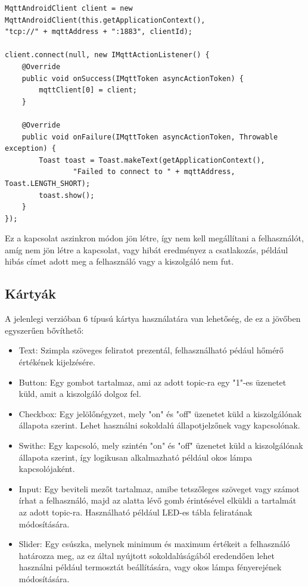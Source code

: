 \documentclass[
]{thesis-ekf}
\theoremstyle{definition}
\theoremstyle{remark}
\begin{document}
\lstset{language=Java}  
\begin{lstlisting}[frame=single]
MqttAndroidClient client = new MqttAndroidClient(this.getApplicationContext(),
"tcp://" + mqttAddress + ":1883", clientId);

client.connect(null, new IMqttActionListener() {
	@Override
	public void onSuccess(IMqttToken asyncActionToken) {
		mqttClient[0] = client;
	}

	@Override
	public void onFailure(IMqttToken asyncActionToken, Throwable exception) {
		Toast toast = Toast.makeText(getApplicationContext(),
				"Failed to connect to " + mqttAddress, Toast.LENGTH_SHORT);
		toast.show();
	}
});
\end{lstlisting}

Ez a kapcsolat aszinkron módon jön létre, így nem kell megállítani a felhasználót, amíg nem jön létre a
kapcsolat, vagy hibát eredményez a csatlakozás, például hibás címet adott meg a felhasználó vagy
a kiszolgáló nem fut.

\subsection{Kártyák}
A jelenlegi verzióban 6 típusú kártya használatára van lehetőség, de ez a jövőben egyszerűen bővíthető:
\begin{itemize}
	\item Text: Szimpla szöveges feliratot prezentál, felhasználható pédául hőmérő értékének kijelzésére.
	\item Button: Egy gombot tartalmaz, ami az adott topic-ra egy "1"-es üzenetet küld, amit a kiszolgáló
	dolgoz fel.
	\item Checkbox: Egy jelölőnégyzet, mely "on" és "off" üzenetet küld a kiszolgálónak állapota szerint.
	Lehet használni sokoldalú állapotjelzőnek vagy kapcsolónak.
	\item Swithc: Egy kapcsoló, mely szintén "on" és "off" üzenetet küld a kiszolgálónak állapota szerint,
	így logikusan alkalmazható például okos lámpa kapcsolójaként.
	\item Input: Egy beviteli mezőt tartalmaz, amibe tetszőleges szöveget vagy számot írhat a felhasználó,
	majd az alatta lévő gomb érintésével elküldi a tartalmát az adott topic-ra. Használható például LED-es
	tábla feliratának módosítására.
	\item Slider: Egy csúszka, melynek minimum és maximum értékeit a felhasználó határozza meg, az ez
	által nyújtott sokoldalúságából eredendően lehet használni például termosztát beállítására, vagy
	okos lámpa fényerejének módosítására.
\end{itemize}
\end{document}
